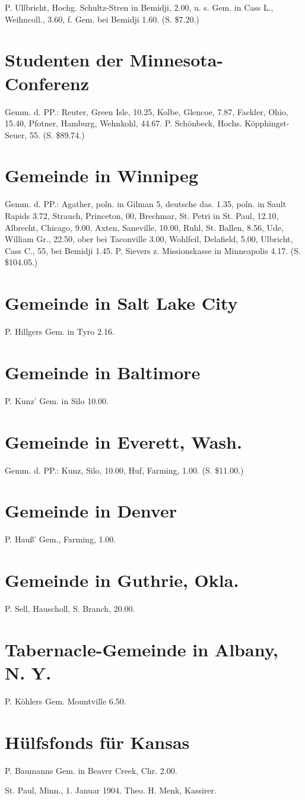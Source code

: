 P. Ullbricht, Hochg. Schultz-Stren in Bemidji, 2.00, u. s. Gem. in Cass L., Weihncoll., 3.60, f. Gem. bei Bemidji 1.60. (S. \$7.20.)

\section{Studenten der Minnesota-Conferenz}

Gemm. d. PP.: Reuter,
Green Isle, 10.25, Kolbe, Glencoe, 7.87, Fackler, Ohio, 15.40, Pfotner, Hamburg, Wehnkohl, 44.67. P. Schönbeck, Hochs. Köpphingst-Seuer, 55. (S. \$89.74.)

\section{Gemeinde in Winnipeg}

Gemm. d. PP.: Agather, poln. in Gilman 5, deutsche das. 1.35, poln. in Sault Rapids 3.72, Strauch, Princeton, 00, Brechmar, St. Petri in St. Paul, 12.10, Albrecht, Chicago, 9.00, Axten, Saneville, 10.00, Ruhl, St. Ballen, 8.56, Ude, William Gr., 22.50, ober bei Taconville 3.00, Wohlfeil, Delafield, 5.00, Ulbricht, Cass C., 55, bei Bemidji 1.45. P. Sievers z. Missionskasse in Minneapolis 4.17. (S. \$104.05.)

\section{Gemeinde in Salt Lake City}

P. Hillgers Gem. in Tyro 2.16.

\section{Gemeinde in Baltimore}

P. Kunz' Gem. in Silo 10.00.

\section{Gemeinde in Everett, Wash.}

Gemm. d. PP.: Kunz, Silo, 10.00, Huf, Farming, 1.00. (S. \$11.00.)

\section{Gemeinde in Denver}

P. Hauß' Gem., Farming, 1.00.

\section{Gemeinde in Guthrie, Okla.}

P. Sell, Hauscholl, S. Branch, 20.00.

\section{Tabernacle-Gemeinde in Albany, N. Y.}

P. Köhlers Gem. Mountville 6.50.

\section{Hülfsfonds für Kansas}

P. Baumanns Gem. in Beaver Creek, Chr. 2.00.

St. Paul, Minn., 1. Januar 1904. Theo. H. Menk, Kassirer.
